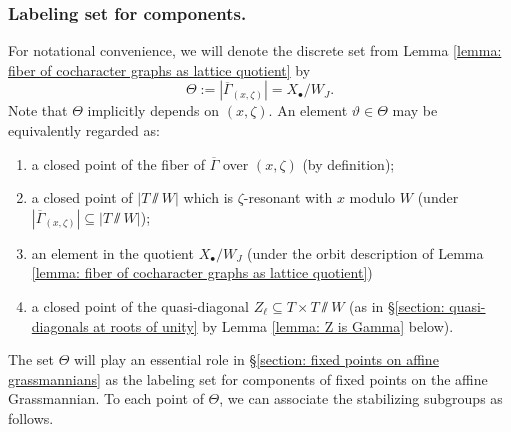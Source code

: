 \subsubsection{Labeling set for components.}\label{section: some useful notation}
\begin{notation}\label{notation: Theta}
For notational convenience, we will denote the discrete set from Lemma \ref{lemma: fiber of cocharacter graphs as lattice quotient} by
\begin{equation*}
    \Theta := |\overline{\Gamma}_{(x, \zeta)}| = X_{\bullet} /  W_J.
\end{equation*}
Note that $\Theta$ implicitly depends on $(x, \zeta)$. An element $\vartheta \in \Theta$ may be equivalently regarded as:
\begin{enumerate}
    \item[(i)] a closed point of the fiber of $\overline{\Gamma}$ over $(x, \zeta)$ (by definition);
    \item[(ii)] a closed point of $|T\sslash W|$ which is $\zeta$-resonant with $x$ modulo $W$ (under $ |\overline{\Gamma}_{(x, \zeta)}| \subseteq |T \sslash W|$);
    \item[(iii)] an element in the quotient $X_{\bullet} /  W_J$ (under the orbit description of Lemma \ref{lemma: fiber of cocharacter graphs as lattice quotient})
    \item[(iv)] a closed point of the quasi-diagonal $Z_{\ell} \subseteq T \times T \sslash W$ (as in \S \ref{section: quasi-diagonals at roots of unity} by Lemma \ref{lemma: Z is Gamma} below).
\end{enumerate} 
\end{notation}

The set $\Theta$ will play an essential role in \S \ref{section: fixed points on affine grassmannians} as the labeling set for components of fixed points on the affine Grassmannian. To each point of $\Theta$, we can associate the stabilizing subgroups as follows.

